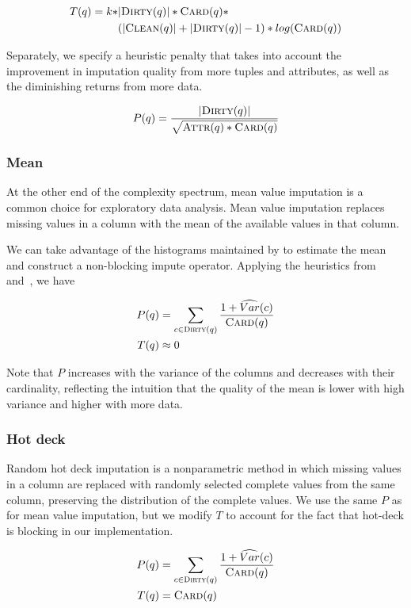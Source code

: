 {\begin{equation*}
    \begin{aligned}
    T(q) = k * &|\textsc{Dirty}(q)| * \textsc{Card}(q) * \\
               &(|\textsc{Clean}(q)| + |\textsc{Dirty}(q)| - 1) * log(\textsc{Card}(q))
    \end{aligned}
\end{equation*}

Separately, we specify a heuristic penalty that takes into account the
improvement in imputation quality from more tuples and attributes, as well as
the diminishing returns from more data.

\[
    P(q) = \frac{|\textsc{Dirty}(q)|}{\sqrt{ \textsc{Attr}(q) * \textsc{Card}(q)}}
\]

\subsubsection{Mean}\label{subsubsec:mean}

At the other end of the complexity spectrum, mean value imputation is a common choice for exploratory data analysis.
Mean value imputation replaces missing values in a column with the mean of the available values in that column.

We can take advantage of the histograms maintained by \ProjectName{} to estimate the mean and construct a non-blocking impute operator.
Applying the heuristics from~ and~, we
have

\begin{equation*}
\begin{aligned}
    P(q) &= \sum_{c \in \textsc{Dirty}(q)} \frac{1+\widehat{Var}(c)}{\textsc{Card}(q)} \\
    T(q) &\approx 0
\end{aligned}
\end{equation*}

Note that $P$ increases with the variance of the columns and decreases with their cardinality, reflecting the intuition that the quality of the mean is lower with high variance and higher with more data.

\subsubsection{Hot deck}

Random hot deck imputation is a nonparametric method in which missing values in a column are
replaced with randomly selected complete values from the same column, preserving the
distribution of the complete values. We use the same $P$ as for mean value imputation, but
we modify $T$ to account for the fact that hot-deck is blocking in our implementation.  

\begin{equation*}
\begin{aligned}
    P(q) &= \sum_{c \in \textsc{Dirty}(q)} \frac{1+\widehat{Var}(c)}{\textsc{Card}(q)} \\
    T(q) &= \textsc{Card}(q)
\end{aligned}
\end{equation*}
}

